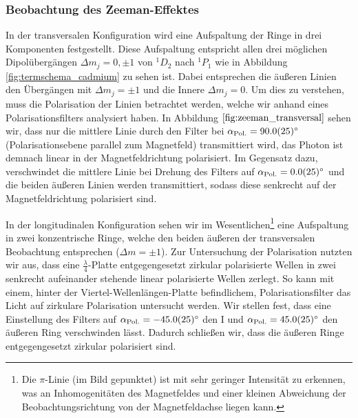 \documentclass[11pt, a4paper]{article}
\begin{document}
\subsubsection{Beobachtung des Zeeman-Effektes}
In der transversalen Konfiguration wird eine Aufspaltung der Ringe in drei Komponenten festgestellt.
Diese Aufspaltung entspricht allen drei möglichen Dipolübergängen $\Delta m_j = 0, \pm 1$ von $^1D_2$ nach $^1P_1$ wie in Abbildung \ref{fig:termschema_cadmium} zu sehen ist.
Dabei entsprechen die äußeren Linien den Übergängen mit $\Delta m_j = \pm 1$ und die Innere $\Delta m_j = 0$.
Um dies zu verstehen, muss die Polarisation der Linien betrachtet werden, welche wir anhand eines Polarisationsfilters analysiert haben.
In Abbildung $\ref{fig:zeeman_transversal}$ sehen wir, dass nur die mittlere Linie durch den Filter bei $\alpha_\mathrm{Pol.} = \SI{90 +- 2,5}{\degree}$ (Polarisationsebene parallel zum Magnetfeld) transmittiert wird,  das Photon ist demnach linear in der Magnetfeldrichtung polarisiert.
Im Gegensatz dazu, verschwindet die mittlere Linie bei Drehung des Filters auf $\alpha_\mathrm{Pol.} = \SI{0 +- 2,5}{\degree}$ und die beiden äußeren Linien werden transmittiert, sodass diese senkrecht auf der Magnetfeldrichtung polarisiert sind.

In der longitudinalen Konfiguration sehen wir im Wesentlichen\footnote{Die $\pi$-Linie (im Bild gepunktet) ist mit sehr geringer Intensität zu erkennen, was an Inhomogenitäten des Magnetfeldes und einer kleinen Abweichung der Beobachtungsrichtung von der Magnetfeldachse liegen kann.} eine Aufspaltung in zwei konzentrische Ringe, welche den beiden äußeren der transversalen Beobachtung entsprechen ($\Delta m = \pm 1$).
Zur Untersuchung der Polarisation nutzten wir aus, dass eine $\frac{\lambda}{4}$-Platte entgegengesetzt zirkular polarisierte Wellen in zwei senkrecht aufeinander stehende linear polarisierte Wellen zerlegt.
So kann mit einem, hinter der Viertel-Wellenlängen-Platte befindlichem, Polarisationsfilter das Licht auf zirkulare Polarisation untersucht werden.
Wir stellen fest, dass eine Einstellung des Filters auf $\alpha_\mathrm{Pol.} = \SI{-45 +- 2,5}{\degree}$ den I und $\alpha_\mathrm{Pol.} = \SI{+45 +- 2,5}{\degree}$ den äußeren Ring verschwinden lässt.
Dadurch schließen wir, dass die äußeren Ringe entgegengesetzt zirkular polarisiert sind.
\end{document}

